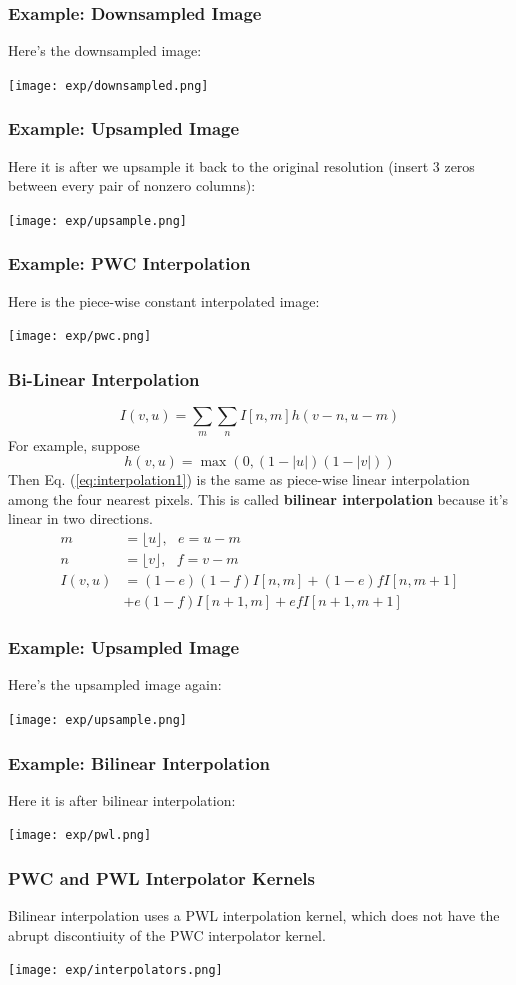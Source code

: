 \documentclass{beamer}
\begin{document}
\begin{frame}
  \frametitle{Example: Downsampled Image}
  Here's the downsampled image:
  \centerline{\texttt{[image: exp/downsampled.png]}}
\end{frame}

\begin{frame}
  \frametitle{Example: Upsampled Image} Here it is after we upsample
  it back to the original resolution (insert 3 zeros between every
  pair of nonzero columns):
  \centerline{\texttt{[image: exp/upsample.png]}}
\end{frame}

\begin{frame}
  \frametitle{Example: PWC Interpolation}

  Here is the piece-wise constant interpolated image:
  \centerline{\texttt{[image: exp/pwc.png]}}
\end{frame}

\begin{frame}
  \frametitle{Bi-Linear Interpolation}
  \[
  I(v,u) = \sum_m\sum_n I[n,m] h(v-n,u-m)
  \]
  For example, suppose
  \[
  h(v,u) = \max\left(0,(1-|u|)(1-|v|)\right)
  \]
  Then Eq. (\ref{eq:interpolation1}) is the same as piece-wise linear
  interpolation among the four nearest pixels.  This is called {\bf
    bilinear interpolation} because it's linear in two directions.
  \begin{align*}
    m &= \lfloor u\rfloor,~~~e=u-m\\
    n &= \lfloor v\rfloor,~~~f=v-m\\
    I(v,u) &= (1-e)(1-f)I[n,m]+(1-e)fI[n,m+1]\\
    &+e(1-f)I[n+1,m]+efI[n+1,m+1]
  \end{align*}
\end{frame}

\begin{frame}
  \frametitle{Example: Upsampled Image}

  Here's the upsampled image again:
  \centerline{\texttt{[image: exp/upsample.png]}}
\end{frame}

\begin{frame}
  \frametitle{Example: Bilinear Interpolation}

  Here it is after bilinear interpolation:
  \centerline{\texttt{[image: exp/pwl.png]}}
\end{frame}


\begin{frame}
  \frametitle{PWC and PWL Interpolator Kernels}

  Bilinear interpolation uses a PWL interpolation kernel, which does
  not have the abrupt discontiuity of the PWC interpolator kernel.
  \centerline{\texttt{[image: exp/interpolators.png]}}
\end{frame}
\end{document}

